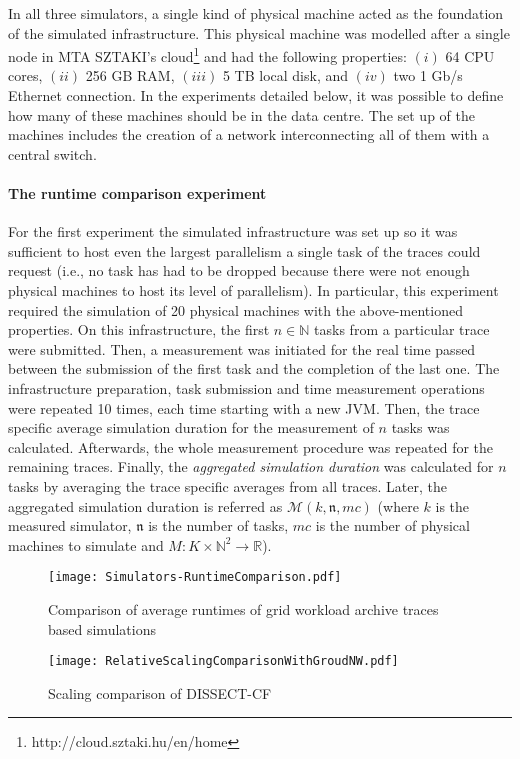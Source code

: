 \documentclass[sort, compress, 5p]{elsarticle}
\begin{document}
In all three simulators, a single kind of physical machine acted as the foundation of the simulated infrastructure. This physical machine was modelled after a single node in MTA SZTAKI's cloud\footnote{http://cloud.sztaki.hu/en/home} and had the following properties: $(i)$ 64 CPU cores, $(ii)$ 256 GB RAM, $(iii)$ 5 TB local disk, and $(iv)$ two 1 Gb/s Ethernet connection. In the experiments detailed below, it was possible to define how many of these machines should be in the data centre. The set up of the machines includes the creation of a network interconnecting all of them with a central switch.

\paragraph{The runtime comparison experiment}

For the first experiment the simulated infrastructure was set up so it was sufficient to host even the largest parallelism a single task of the traces could request (i.e., no task has had to be dropped because there were not enough physical machines to host its level of parallelism). In particular, this experiment required the simulation of 20 physical machines with the above-mentioned properties. On this infrastructure, the first $n\in\mathbb{N}$ tasks from a particular trace were submitted. Then, a measurement was initiated for the real time passed between the submission of the first task and the completion of the last one. The infrastructure preparation, task submission and time measurement operations were repeated 10 times, each time starting with a new JVM. Then, the trace specific average simulation duration for the measurement of $n$ tasks was calculated. Afterwards, the whole measurement procedure was repeated for the remaining traces. Finally, the \emph{aggregated simulation duration} was calculated for $n$ tasks by averaging the trace specific averages from all traces. Later, the aggregated simulation duration is referred as $\mathcal{M}(k,\mathfrak{n},mc)$ (where $k$ is the measured simulator, $\mathfrak{n}$ is the number of tasks, $mc$ is the number of physical machines to simulate and $M: K\times \mathbb{N}^2\to\mathbb{R}$).

\begin{figure}[tb]
\center
\texttt{[image: Simulators-RuntimeComparison.pdf]}
\caption{Comparison of average runtimes of grid workload archive traces based simulations\label{FIG-RuntimeCompare}}
\end{figure}
\begin{figure*}[tb]
\center
\texttt{[image: RelativeScalingComparisonWithGroudNW.pdf]}
\caption{Scaling comparison of DISSECT-CF \label{FIG-ScalingCompare}}
\end{figure*}
\end{document}
